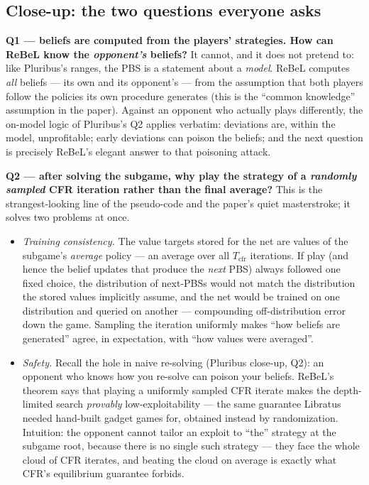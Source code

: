 \documentclass[11pt,a4paper]{article}
\begin{document}
\subsection{Close-up: the two questions everyone asks}

\textbf{Q1 --- beliefs are computed from the players' strategies. How can
ReBeL know the \emph{opponent's} beliefs?} It cannot, and it does not
pretend to: like Pluribus's ranges, the PBS is a statement about a
\emph{model}. ReBeL computes \emph{all} beliefs --- its own and its
opponent's --- from the assumption that both players follow the policies its
own procedure generates (this is the ``common knowledge'' assumption in the
paper). Against an opponent who actually plays differently, the on-model
logic of Pluribus's Q2 applies verbatim: deviations are, within the model,
unprofitable; early deviations can poison the beliefs; and the next question
is precisely ReBeL's elegant answer to that poisoning attack.

\textbf{Q2 --- after solving the subgame, why play the strategy of a
\emph{randomly sampled} CFR iteration rather than the final average?} This
is the strangest-looking line of the pseudo-code and the paper's quiet
masterstroke; it solves two problems at once.

\begin{itemize}[leftmargin=1.4em, itemsep=2pt]
\item \emph{Training consistency.} The value targets stored for the net are
  values of the subgame's \emph{average} policy --- an average over all
  $T_{\mathrm{cfr}}$ iterations. If play (and hence the belief updates that
  produce the \emph{next} PBS) always followed one fixed choice, the
  distribution of next-PBSs would not match the distribution the stored
  values implicitly assume, and the net would be trained on one
  distribution and queried on another --- compounding off-distribution error
  down the game. Sampling the iteration uniformly makes ``how beliefs are
  generated'' agree, in expectation, with ``how values were averaged''.
\item \emph{Safety.} Recall the hole in naive re-solving (Pluribus close-up,
  Q2): an opponent who knows how you re-solve can poison your beliefs.
  ReBeL's theorem says that playing a uniformly sampled CFR iterate makes
  the depth-limited search \emph{provably} low-exploitability --- the same
  guarantee Libratus needed hand-built gadget games for, obtained instead by
  randomization. Intuition: the opponent cannot tailor an exploit to ``the''
  strategy at the subgame root, because there is no single such strategy ---
  they face the whole cloud of CFR iterates, and beating the cloud on
  average is exactly what CFR's equilibrium guarantee forbids.
\end{itemize}
\end{document}
